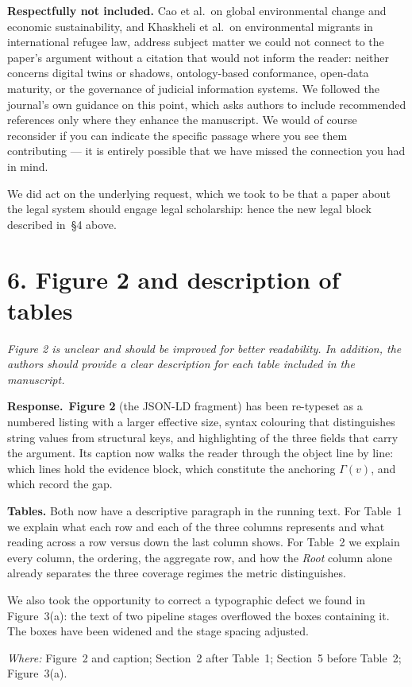 \documentclass[11pt,a4paper]{article}
\newenvironment{comment}
  {\begin{mdframed}[backgroundcolor=cmtbg, linecolor=cmtrule, linewidth=0.6pt,
     innertopmargin=5pt, innerbottommargin=5pt, innerleftmargin=7pt,
     innerrightmargin=7pt, skipabove=4pt, skipbelow=6pt]\itshape}
  {\end{mdframed}}
\newcommand{\resp}{\par\noindent\textbf{Response.}\ }
\newcommand{\done}[1]{\par\vspace{2pt}\noindent\textit{Where:} #1\par\vspace{4pt}}
\begin{document}
\textbf{Respectfully not included.} Cao et al.\ on global environmental change and economic sustainability, and Khaskheli et al.\ on environmental migrants in international refugee law, address subject matter we could not connect to the paper's argument without a citation that would not inform the reader: neither concerns digital twins or shadows, ontology-based conformance, open-data maturity, or the governance of judicial information systems. We followed the journal's own guidance on this point, which asks authors to include recommended references only where they enhance the manuscript. We would of course reconsider if you can indicate the specific passage where you see them contributing --- it is entirely possible that we have missed the connection you had in mind.

We did act on the underlying request, which we took to be that a paper about the legal system should engage legal scholarship: hence the new legal block described in~\S4 above.

\section*{6. Figure 2 and description of tables}
\begin{comment}
Figure 2 is unclear and should be improved for better readability. In addition, the authors should provide a clear description for each table included in the manuscript.
\end{comment}
\resp \textbf{Figure 2} (the JSON-LD fragment) has been re-typeset as a numbered listing with a larger effective size, syntax colouring that distinguishes string values from structural keys, and highlighting of the three fields that carry the argument. Its caption now walks the reader through the object line by line: which lines hold the evidence block, which constitute the anchoring $\Gamma(v)$, and which record the gap.

\textbf{Tables.} Both now have a descriptive paragraph in the running text. For Table~1 we explain what each row and each of the three columns represents and what reading across a row versus down the last column shows. For Table~2 we explain every column, the ordering, the aggregate row, and how the \emph{Root} column alone already separates the three coverage regimes the metric distinguishes.

We also took the opportunity to correct a typographic defect we found in Figure~3(a): the text of two pipeline stages overflowed the boxes containing it. The boxes have been widened and the stage spacing adjusted.
\done{Figure~2 and caption; Section~2 after Table~1; Section~5 before Table~2; Figure~3(a).}
\end{document}
